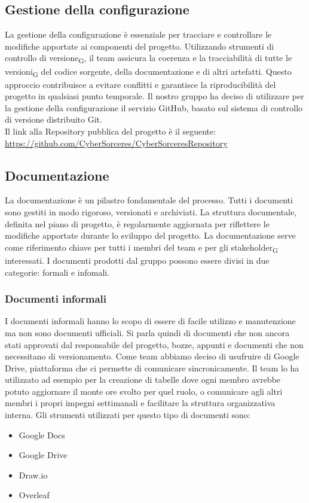 \documentclass{article}
\begin{document}
\subsection{Gestione della configurazione}
La gestione della configurazione è essenziale per tracciare e controllare le modifiche apportate ai componenti del progetto. Utilizzando strumenti di controllo di versione\textsubscript{G}, il team assicura la coerenza e la tracciabilità di tutte le versioni\textsubscript{G} del codice sorgente, della documentazione e di altri artefatti. Questo approccio contribuisce a evitare conflitti e garantisce la riproducibilità del progetto in qualsiasi punto temporale. Il nostro gruppo ha deciso di utilizzare per la gestione della configurazione il servizio GitHub, basato sul sistema di controllo di versione distribuito Git. \\ Il link alla Repository pubblica del progetto è il seguente: \\ \href{https://github.com/CyberSorceres/CyberSorceresRepository}{https://github.com/CyberSorceres/CyberSorceresRepository}


\subsection{Documentazione}
La documentazione è un pilastro fondamentale del processo. Tutti i documenti sono gestiti in modo rigoroso, versionati e archiviati. La struttura documentale, definita nel piano di progetto, è regolarmente aggiornata per riflettere le modifiche apportate durante lo sviluppo del progetto. La documentazione serve come riferimento chiave per tutti i membri del team e per gli stakeholder\textsubscript{G} interessati. I documenti prodotti dal gruppo possono essere divisi in due categorie: formali e infomali.

\subsubsection{Documenti informali}
I documenti informali hanno lo scopo di essere di facile utilizzo e manutenzione ma non sono documenti ufficiali. Si parla quindi di documenti che non ancora stati approvati dal responsabile del progetto, bozze, appunti e documenti che non necessitano di versionamento. Come team abbiamo deciso di usufruire di Google Drive, piattaforma che ci permette di comunicare sincronicamente. Il team lo ha utilizzato ad esempio per la creazione di tabelle dove ogni membro avrebbe potuto aggiornare il monte ore svolto per quel ruolo, o comunicare agli altri membri i propri impegni settimanali e facilitare la struttura organizzativa interna. Gli strumenti utilizzati per questo tipo di documenti sono:
\begin{itemize}
    \item Google Docs
    \item Google Drive
    \item Draw.io
    \item Overleaf
\end{itemize}
\end{document}
